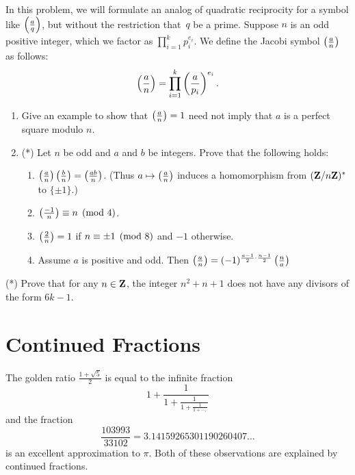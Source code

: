 \begin{exercises}
\item\label{ex:rec13} In this problem, we will formulate an analog of
  quadratic reciprocity for a symbol like $\left(\frac{a}{q}\right)$, but without the
  restriction that~$q$ be a prime.  Suppose $n$ is an odd positive integer,
  which we factor as $\prod_{i=1}^k p_i^{e_i}$.  We
  define the Jacobi symbol $\left(\frac{a}{n}\right)$ as follows:
  $$
  \left(\frac{a}{n}\right) = \prod_{i=1}^k \left(\frac{a}{p_i}\right)^{e_i}.
  $$
\begin{enumerate}
\item Give an example to show that $\left(\frac{a}{n}\right)=1$ need not imply that
  $a$ is a perfect square modulo $n$.
\item (*) Let $n$ be odd and $a$ and $b$ be integers.  Prove that the
  following holds:
\begin{enumerate}
\item $\left(\frac{a}{n}\right)\left(\frac{b}{n}\right) = \left(\frac{ab}{n}\right)$. (Thus $a\mapsto \left(\frac{a}{n}\right)$
  induces a homomorphism from $(\mathbf{Z}/n\mathbf{Z}{})^*$ to $\{\pm 1\}$.)
\item $\left(\frac{-1}{n}\right) \equiv n \pmod{4}$.
\item $\left(\frac{2}{n}\right)=1$ if $n\equiv \pm 1\pmod{8}$ and $-1$ otherwise.
\item Assume $a$ is positive and odd.  Then $\left(\frac{a}{n}\right) =
  (-1)^{\frac{a-1}{2} \cdot \frac{n-1}{2}} \left(\frac{n}{a}\right)$
\end{enumerate}
\end{enumerate}

\item\label{ex:rec14}(*) Prove that for any $n\in\mathbf{Z}$, the integer
  $n^2+n+1$ does not have any divisors of the form $6k-1$.

\end{exercises}



\chapter{Continued Fractions}\label{ch:contfrac}

The golden ratio
$\frac{1+\sqrt{5}}{2}$ is
equal to the infinite fraction
$$
1+ \frac{\displaystyle 1}{\displaystyle 1+ \frac{\displaystyle 1}{\displaystyle 1 +
\frac{1}{1 + \cdots,}}}
$$
and the fraction
$$
\frac{103993}{33102}=3.14159265301190260407\ldots
$$
is an excellent approximation to $\pi$.
Both of these observations are explained by continued fractions.

